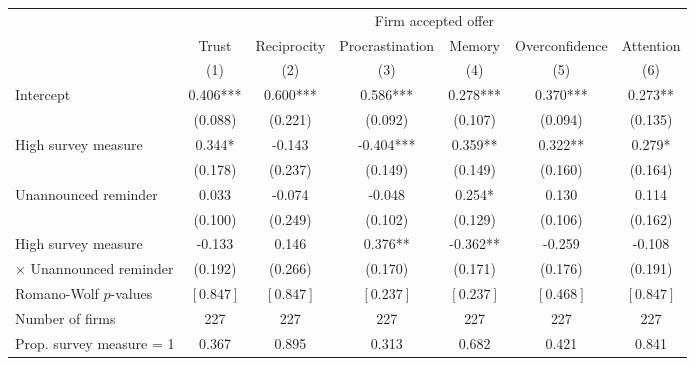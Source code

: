 \begin{tabular}[t]{lcccccc}
\toprule
& \multicolumn{6}{c}{Firm accepted offer} \\
\cmidrule(lr){2-7} 

  & Trust & Reciprocity & Procrastination & Memory & Overconfidence & Attention\\
& (1) & (2) & (3) & (4) & (5) & (6)\\
\midrule
Intercept & 0.406*** & 0.600*** & 0.586*** & 0.278*** & 0.370*** & 0.273**\\
 & (0.088) & (0.221) & (0.092) & (0.107) & (0.094) & (0.135)\\
High survey measure & 0.344* & -0.143 & -0.404*** & 0.359** & 0.322** & 0.279*\\
 & (0.178) & (0.237) & (0.149) & (0.149) & (0.160) & (0.164)\\
Unannounced reminder & 0.033 & -0.074 & -0.048 & 0.254* & 0.130 & 0.114\\
 & (0.100) & (0.249) & (0.102) & (0.129) & (0.106) & (0.162)\\
High survey measure & -0.133 & 0.146 & 0.376** & -0.362** & -0.259 & -0.108\\
 \quad $\times$ Unannounced reminder & (0.192) & (0.266) & (0.170) & (0.171) & (0.176) & (0.191)\\
Romano-Wolf $p$-values &$[0.847]$ &$[0.847]$ &$[0.237]$ &$[0.237]$ &$[0.468]$ &$[0.847]$ \\
\midrule
Number of firms & 227 & 227 & 227 & 227 & 227 & 227\\
Prop. survey measure = 1 & 0.367 & 0.895 & 0.313 & 0.682 & 0.421 & 0.841\\
\bottomrule
\end{tabular}
